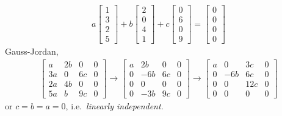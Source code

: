 \documentclass[a4paper,norsk,12pt]{article}
\begin{document}
\begin{align*}
  a
    \left[
      \begin{array}{c}
        1 \\ 3 \\ 2 \\ 5
      \end{array}
    \right]
  + b
    \left[
      \begin{array}{c}
        2 \\ 0 \\ 4 \\ 1
      \end{array}
    \right]
  + c
    \left[
      \begin{array}{c}
        0 \\ 6 \\ 0 \\ 9
      \end{array}
    \right]
  =
    \left[
      \begin{array}{c}
        0 \\ 0 \\ 0 \\ 0
      \end{array}
    \right]
\end{align*}
Gauss-Jordan,
\begin{align*}
  \left[
    \begin{array}{ccc|c}
       a & 2b &  0 & 0 \\
      3a &  0 & 6c & 0 \\
      2a & 4b &  0 & 0 \\
      5a &  b & 9c & 0
    \end{array}
  \right] \rightarrow
  \left[
    \begin{array}{ccc|c}
       a & 2b &  0 & 0 \\
       0 &-6b & 6c & 0 \\
       0 &  0 &  0 & 0 \\
       0 &-3b & 9c & 0
    \end{array}
  \right] \rightarrow
  \left[
    \begin{array}{ccc|c}
       a &  0 & 3c & 0 \\
       0 &-6b & 6c & 0 \\
       0 &  0 &12c & 0 \\
       0 &  0 &  0 & 0
    \end{array}
  \right]
\end{align*}
or $c=b=a=0$, i.e.~\textit{linearly independent}.
\end{document}
